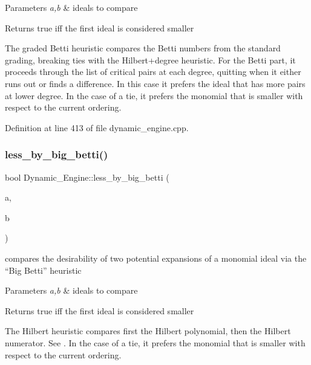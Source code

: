 \begin{DoxyParams}{Parameters}
{\em a,b} & ideals to compare \\
\hline
\end{DoxyParams}
\begin{DoxyReturn}{Returns}
{\ttfamily true} iff the first ideal is considered smaller
\end{DoxyReturn}
The graded Betti heuristic compares the Betti numbers from the standard grading, breaking ties with the Hilbert+degree heuristic. For the Betti part, it proceeds through the list of critical pairs at each degree, quitting when it either runs out or finds a difference. In this case it prefers the ideal that has more pairs at lower degree. In the case of a tie, it prefers the monomial that is smaller with respect to the current ordering. 

Definition at line 413 of file dynamic\+\_\+engine.\+cpp.

\mbox{\label{namespace_dynamic___engine_a083c09fdc98db92614d126a5cca19a24}} 
\subsubsection{\texorpdfstring{less\+\_\+by\+\_\+big\+\_\+betti()}{less\_by\_big\_betti()}}
{\footnotesize\ttfamily bool Dynamic\+\_\+\+Engine\+::less\+\_\+by\+\_\+big\+\_\+betti (\begin{DoxyParamCaption}\item[{\hyperlink{group___g_b_computation_class_dynamic___engine_1_1_p_p___with___ideal}{P\+P\+\_\+\+With\+\_\+\+Ideal} \&}]{a,  }\item[{\hyperlink{group___g_b_computation_class_dynamic___engine_1_1_p_p___with___ideal}{P\+P\+\_\+\+With\+\_\+\+Ideal} \&}]{b }\end{DoxyParamCaption})}



compares the desirability of two potential expansions of a monomial ideal via the ``Big Betti'' heuristic 


\begin{DoxyParams}{Parameters}
{\em a,b} & ideals to compare \\
\hline
\end{DoxyParams}
\begin{DoxyReturn}{Returns}
{\ttfamily true} iff the first ideal is considered smaller
\end{DoxyReturn}
The Hilbert heuristic compares first the Hilbert polynomial, then the Hilbert numerator. See \cite{CaboaraDynAlg}. In the case of a tie, it prefers the monomial that is smaller with respect to the current ordering. 

